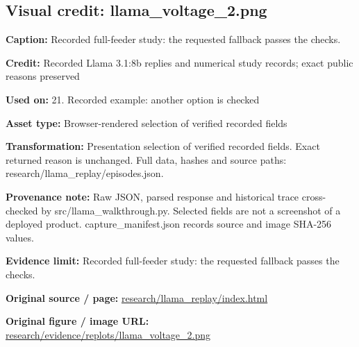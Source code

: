 \documentclass[10pt,letterpaper]{article}
\begin{document}
\subsection*{Visual credit: llama\_voltage\_2.png}
\textbf{Caption:} Recorded full-feeder study: the requested fallback passes the checks.\par
\textbf{Credit:} Recorded Llama 3.1:8b replies and numerical study records; exact public reasons preserved\par
\textbf{Used on:} 21. Recorded example: another option is checked\par
\textbf{Asset type:} Browser-rendered selection of verified recorded fields\par
\textbf{Transformation:} Presentation selection of verified recorded fields. Exact returned reason is unchanged. Full data, hashes and source paths: research/llama\_replay/episodes.json.\par
\textbf{Provenance note:} Raw JSON, parsed response and historical trace cross-checked by src/llama\_walkthrough.py. Selected fields are not a screenshot of a deployed product. capture\_manifest.json records source and image SHA-256 values.\par
\textbf{Evidence limit:} Recorded full-feeder study: the requested fallback passes the checks.\par
\textbf{Original source / page:} \href{../research/llama_replay/index.html}{\small\ttfamily research/\allowbreak{}llama\_\allowbreak{}replay/\allowbreak{}index.\allowbreak{}html}\par
\textbf{Original figure / image URL:} \href{../research/evidence/replots/llama_voltage_2.png}{\small\ttfamily research/\allowbreak{}evidence/\allowbreak{}replots/\allowbreak{}llama\_\allowbreak{}voltage\_\allowbreak{}2.\allowbreak{}png}\par
\par\medskip
\end{document}
